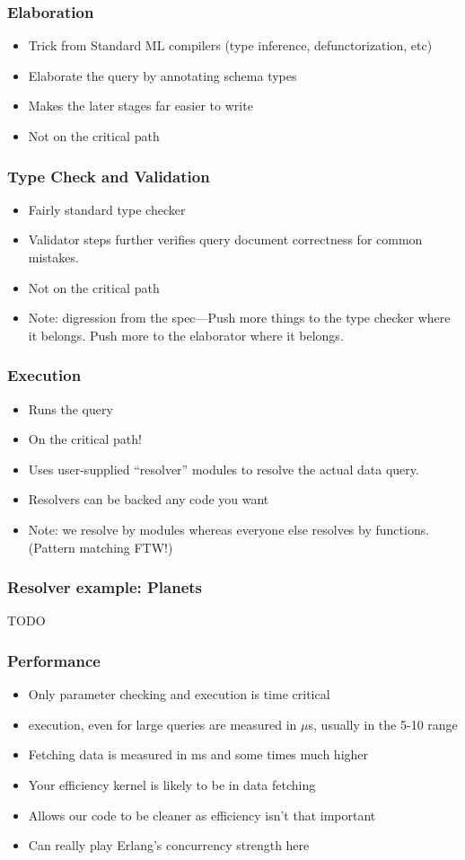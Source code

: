 \documentclass[lualatex]{beamer}
\begin{document}
\begin{frame}
  \frametitle{Elaboration}
  \begin{itemize}
  \item Trick from Standard ML compilers (type inference,
    defunctorization, etc)
  \item Elaborate the query by annotating schema types
  \item Makes the later stages far easier to write
  \item Not on the critical path
  \end{itemize}
\end{frame}

\begin{frame}
  \frametitle{Type Check and Validation}
  \begin{itemize}
  \item Fairly standard type checker
  \item Validator steps further verifies query document correctness
    for common mistakes.
  \item Not on the critical path
  \item Note: digression from the spec---Push more things to the type
    checker where it belongs. Push more to the elaborator where it belongs.
  \end{itemize}
\end{frame}

\begin{frame}
  \frametitle{Execution}
  \begin{itemize}
  \item Runs the query
  \item On the critical path!
  \item Uses user-supplied ``resolver'' modules to resolve the
    actual data query.
  \item Resolvers can be backed any code you want
  \item Note: we resolve by modules whereas everyone else resolves by
    functions. (Pattern matching FTW!)
  \end{itemize}
\end{frame}

\begin{frame}
  \frametitle{Resolver example: Planets}
  TODO
\end{frame}

\begin{frame}
  \frametitle{Performance}
  \begin{itemize}
  \item Only parameter checking and execution is time critical
  \item execution, even for large queries are measured in $\mu{}$s,
    usually in the 5-10 range
  \item Fetching data is measured in ms and some times much higher
  \item Your efficiency kernel is likely to be in data fetching
  \item Allows our code to be cleaner as efficiency isn't that
    important
  \item Can really play Erlang's concurrency strength here
  \end{itemize}
\end{frame}
\end{document}
